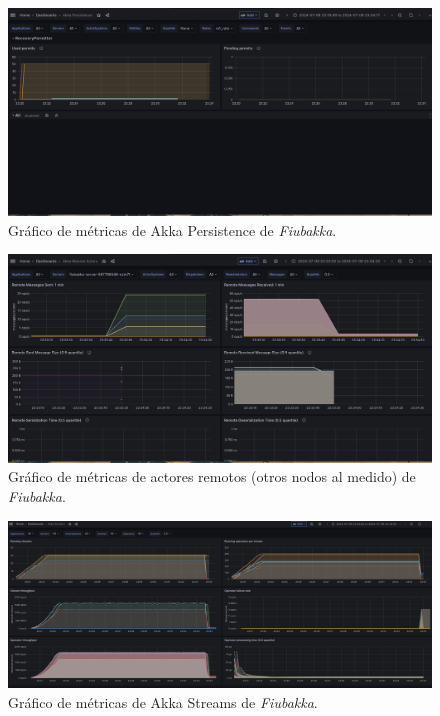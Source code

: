 \begin{figure}[htbp]
    \centering
    \includegraphics[width=1\textwidth]{../assets/persistence-metrics.png}
    \caption{Gráfico de métricas de Akka Persistence de \textit{Fiubakka}.}
\end{figure}

\begin{figure}[htbp]
    \centering
    \includegraphics[width=1\textwidth]{../assets/remote-actors-metrics.png}
    \caption{Gráfico de métricas de actores remotos (otros nodos al medido) de \textit{Fiubakka}.}
\end{figure}

\begin{figure}[htbp]
    \centering
    \includegraphics[width=1\textwidth]{../assets/streams-metrics.png}
    \caption{Gráfico de métricas de Akka Streams de \textit{Fiubakka}.}
\end{figure}

